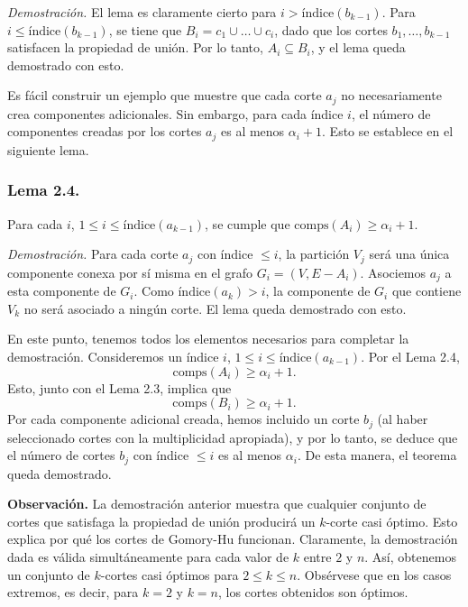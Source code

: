 \documentclass{article}
\begin{document}
\textit{Demostración.} El lema es claramente cierto para \( i > \text{índice}(b_{k-1}) \). Para \( i \leq \text{índice}(b_{k-1}) \), se tiene que \( B_i = c_1 \cup \dots \cup c_i \), dado que los cortes \( b_1, \dots, b_{k-1} \) satisfacen la propiedad de unión. Por lo tanto, \( A_i \subseteq B_i \), y el lema queda demostrado con esto.

Es fácil construir un ejemplo que muestre que cada corte \( a_j \) no necesariamente crea componentes adicionales. Sin embargo, para cada índice \( i \), el número de componentes creadas por los cortes \( a_j \) es al menos \( \alpha_i + 1 \). Esto se establece en el siguiente lema.

\subsubsection*{Lema 2.4.} 
Para cada \( i \), \( 1 \leq i \leq \text{índice}(a_{k-1}) \), se cumple que \( \text{comps}(A_i) \geq \alpha_i + 1 \).

\textit{Demostración.} Para cada corte \( a_j \) con índice \( \leq i \), la partición \( V_j \) será una única componente conexa por sí misma en el grafo \( G_i = (V, E - A_i) \). Asociemos \( a_j \) a esta componente de \( G_i \). Como \( \text{índice}(a_k) > i \), la componente de \( G_i \) que contiene \( V_k \) no será asociado a ningún corte. El lema queda demostrado con esto.

En este punto, tenemos todos los elementos necesarios para completar la demostración. Consideremos un índice \( i \), \( 1 \leq i \leq \text{índice}(a_{k-1}) \). Por el Lema 2.4,
\[
\text{comps}(A_i) \geq \alpha_i + 1.
\]
Esto, junto con el Lema 2.3, implica que
\[
\text{comps}(B_i) \geq \alpha_i + 1.
\]
Por cada componente adicional creada, hemos incluido un corte \( b_j \)  
(al haber seleccionado cortes con la multiplicidad apropiada), y por lo tanto, se deduce que el número de cortes \( b_j \) con índice \( \leq i \) es al menos \( \alpha_i \). De esta manera, el teorema queda demostrado.

\textbf{Observación.} La demostración anterior muestra que cualquier conjunto de cortes que satisfaga la propiedad de unión  
producirá un \( k \)-corte casi óptimo. Esto explica por qué los cortes de Gomory-Hu funcionan.  
Claramente, la demostración dada es válida simultáneamente para cada valor de \( k \) entre \( 2 \) y \( n \).  
Así, obtenemos un conjunto de \( k \)-cortes casi óptimos para \( 2 \leq k \leq n \).  
Obsérvese que en los casos extremos, es decir, para \( k = 2 \) y \( k = n \), los cortes obtenidos son óptimos.
\end{document}
